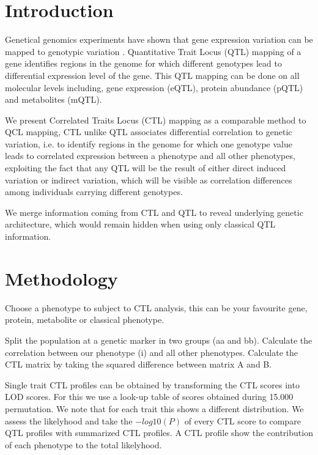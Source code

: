 \documentclass{bioinfo}
\begin{document}
\section{Introduction}
 Genetical genomics experiments have shown that gene expression variation can be mapped to 
  genotypic variation \cite{Jansen:2001}. Quantitative Trait Locus (QTL) mapping of a 
  gene identifies regions in the genome for which different genotypes lead to differential 
  expression level of the gene. This QTL mapping can be done on all molecular levels including, 
  gene expression (eQTL), protein abundance (pQTL) and metabolites (mQTL).
  
  We present Correlated Traits Locus (CTL) mapping as a comparable method to QCL mapping, 
  CTL unlike QTL associates differential correlation to genetic variation, i.e. to identify regions in the 
  genome for which one genotype value leads to correlated expression between a phenotype and all 
  other phenotypes, exploiting the fact that any QTL will be the result of either direct induced 
  variation or indirect variation, which will be visible as correlation differences among 
  individuals carrying different genotypes.
  
  We merge information coming from CTL and QTL to reveal underlying genetic architecture, which 
  would remain hidden when using only classical QTL information.

\section{Methodology}
  Choose a phenotype to subject to CTL analysis, this can be your favourite gene, 
  protein, metabolite or classical phenotype.

  Split the population at a genetic marker in two groups (aa and bb). Calculate the correlation 
  between our phenotype (i) and all other phenotypes. Calculate the CTL matrix by taking the 
  squared difference between matrix A and B.

  Single trait CTL profiles can be obtained by transforming the CTL scores into LOD scores. 
  For this we use a look-up table of scores obtained during 15.000 permutation. We note that for each trait this 
  shows a different distribution. We assess the likelyhood and take the $-log10(P)$ of every CTL score to 
  compare QTL profiles with summarized CTL profiles. A CTL profile show the contribution of each phenotype to 
  the total likelyhood.
\end{document}
